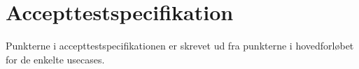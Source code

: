\chapter{Accepttestspecifikation}

Punkterne i accepttestspecifikationen er skrevet ud fra punkterne i hovedforløbet for de
enkelte usecases. 


















